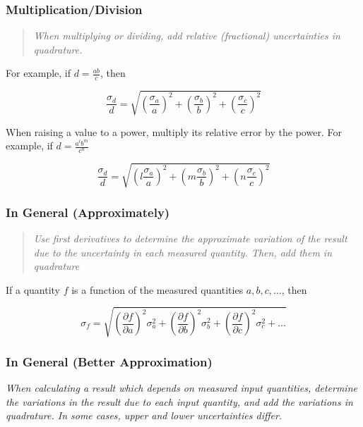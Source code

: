 \documentclass[12pt]{article}
\begin{document}
\subsubsection*{Multiplication/Division}

\begin{quote}
\textit{When multiplying or dividing, add relative (fractional)
uncertainties in quadrature.}
\end{quote}

For example, if $d = \frac{ab}{c}$, then

\begin{equation}
\frac{\sigma_d}{d} = \sqrt{
\left( \frac{\sigma_a}{a} \right)^2
+\left( \frac{\sigma_b}{b} \right)^2
+\left( \frac{\sigma_c}{c} \right)^2
}
\end{equation}

When raising a value to a power, multiply its relative error by the
power. For example, if $d = \frac{a^lb^m}{c^n}$

\begin{equation}
\frac{\sigma_d}{d} = \sqrt{
\left(l \frac{\sigma_a}{a} \right)^2
+\left(m \frac{\sigma_b}{b} \right)^2
+\left(n \frac{\sigma_c}{c} \right)^2
}
\end{equation}

\subsubsection*{In General (Approximately)}

\begin{quote}
\textit{Use first derivatives to determine the approximate
  variation of the result due to the uncertainty in each measured
  quantity. Then, add them in quadrature}
\end{quote}

If a quantity $f$ is a function of the measured quantities $a, b, c,
...$, then

\begin{equation}
\sigma_f = \sqrt{
\left(\frac{\partial f}{\partial a} \right)^2 \sigma_a^2
+\left(\frac{\partial f}{\partial b} \right)^2 \sigma_b^2
+\left(\frac{\partial f}{\partial c} \right)^2 \sigma_c^2 + ...}
\end{equation}

\subsubsection*{In General (Better Approximation)}

\textit{When calculating a result which depends on measured
input quantities, determine the variations in the result due to each
input quantity, and add the variations in quadrature. In some cases,
upper and lower uncertainties differ.}
\end{document}
